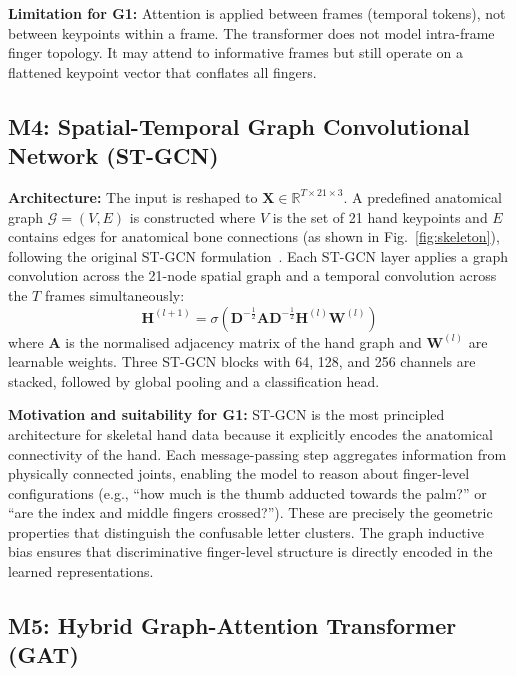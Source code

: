 \documentclass[conference]{IEEEtran}
\begin{document}
\textbf{Limitation for G1:} Attention is applied between frames (temporal
tokens), not between keypoints within a frame. The transformer does not model
intra-frame finger topology. It may attend to informative frames but still
operate on a flattened keypoint vector that conflates all fingers.

\subsection{M4: Spatial-Temporal Graph Convolutional Network (ST-GCN)}

\textbf{Architecture:} The input is reshaped to $\mathbf{X} \in \mathbb{R}^{T
\times 21 \times 3}$. A predefined anatomical graph $\mathcal{G} = (V, E)$ is
constructed where $V$ is the set of 21 hand keypoints and $E$ contains edges
for anatomical bone connections (as shown in Fig.~\ref{fig:skeleton}), following
the original ST-GCN formulation~\cite{yan2018stgcn}. Each ST-GCN layer applies
a graph convolution across the 21-node spatial graph and a temporal convolution
across the $T$ frames simultaneously:
\begin{equation}
  \mathbf{H}^{(l+1)} = \sigma\!\left(
    \mathbf{D}^{-\frac{1}{2}} \mathbf{A} \mathbf{D}^{-\frac{1}{2}}
    \mathbf{H}^{(l)} \mathbf{W}^{(l)}
  \right)
\end{equation}
where $\mathbf{A}$ is the normalised adjacency matrix of the hand graph and
$\mathbf{W}^{(l)}$ are learnable weights. Three ST-GCN blocks with 64, 128, and
256 channels are stacked, followed by global pooling and a classification head.

\textbf{Motivation and suitability for G1:} ST-GCN is the most principled
architecture for skeletal hand data because it explicitly encodes the anatomical
connectivity of the hand. Each message-passing step aggregates information from
physically connected joints, enabling the model to reason about finger-level
configurations (e.g., ``how much is the thumb adducted towards the palm?''
or ``are the index and middle fingers crossed?''). These are precisely the
geometric properties that distinguish the confusable letter clusters. The graph
inductive bias ensures that discriminative finger-level structure is directly
encoded in the learned representations.

\subsection{M5: Hybrid Graph-Attention Transformer (GAT)}
\end{document}
